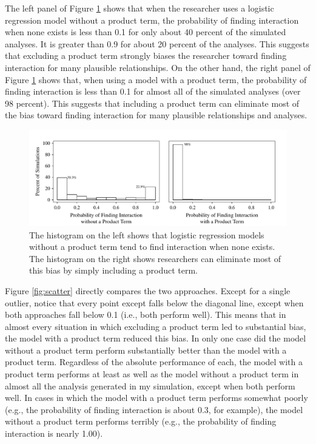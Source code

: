\documentclass[12pt]{article}
\begin{document}
The left panel of Figure \ref{fig:hist} shows that when the researcher uses a logistic regression model without a product term, the probability of finding interaction when none exists is less than 0.1  for only about 40 percent of the simulated analyses. It is greater than 0.9 for about 20 percent of the analyses. This suggests that excluding a product term strongly biases the researcher toward finding interaction for many plausible relationships. On the other hand, the right panel of Figure  \ref{fig:hist} shows that, when using a model with a product term, the probability of finding interaction is less than 0.1  for almost all of the simulated analyses  (over 98 percent).
This suggests that including a product term can eliminate most of the bias toward finding interaction for many plausible relationships and analyses.

\begin{figure}[h]
\begin{center}
\includegraphics[scale = .7]{fig/fig-hist.pdf}
\end{center}\caption{The histogram on the left shows that logistic regression models without a product term tend to find interaction when none exists. The histogram on the right shows researchers can eliminate most of this bias by simply including a product term.}\label{fig:hist}
\end{figure}

Figure \ref{fig:scatter} directly compares the two approaches. Except for a single outlier, notice that every point except falls below the diagonal line, except when both approaches fall below 0.1 (i.e., both perform well). This means that in almost every situation in which excluding a product term led to substantial bias, the model with a product term reduced this bias. In only one case did the model without a product term perform substantially better than the model with a product term. Regardless of the absolute performance of each, the model with a product term performs at least as well as the model without a product term in almost all the analysis generated in my simulation, except when both perform well. In cases in which the model with a product term performs somewhat poorly (e.g., the probability of finding interaction is about 0.3, for example), the model without a product term performs terribly (e.g., the probability of finding interaction is nearly 1.00).
 
\end{document}
